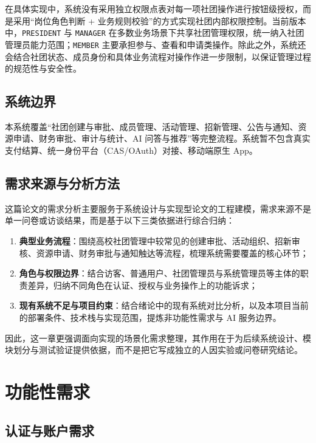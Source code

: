 在具体实现中，系统没有采用独立权限点表对每一项社团操作进行按钮级授权，而是采用“岗位角色判断 + 业务规则校验”的方式实现社团内部权限控制。当前版本中，\texttt{PRESIDENT} 与 \texttt{MANAGER} 在多数业务场景下共享社团管理权限，统一纳入社团管理员能力范围；\texttt{MEMBER} 主要承担参与、查看和申请类操作。除此之外，系统还会结合社团状态、成员身份和具体业务流程对操作作进一步限制，以保证管理过程的规范性与安全性。
\subsection{系统边界}

本系统覆盖“社团创建与审批、成员管理、活动管理、招新管理、公告与通知、资源申请、财务审批、审计与统计、AI 问答与推荐”等完整流程。系统暂不包含真实支付结算、统一身份平台（CAS/OAuth）对接、移动端原生 App。

\subsection{需求来源与分析方法}

这篇论文的需求分析主要服务于系统设计与实现型论文的工程建模，需求来源不是单一问卷或访谈结果，而是基于以下三类依据进行综合归纳：

\begin{enumerate}
  \item \textbf{典型业务流程}：围绕高校社团管理中较常见的创建审批、活动组织、招新审核、资源申请、财务审批与通知触达等流程，梳理系统需要覆盖的核心环节；
  \item \textbf{角色与权限边界}：结合访客、普通用户、社团管理员与系统管理员等主体的职责差异，归纳不同角色在认证、授权与业务操作上的功能诉求；
  \item \textbf{现有系统不足与项目约束}：结合绪论中的现有系统对比分析，以及本项目当前的部署条件、技术栈与实现范围，提炼非功能性需求与 AI 服务边界。
\end{enumerate}

因此，这一章更强调面向实现的场景化需求整理，其作用在于为后续系统设计、模块划分与测试验证提供依据，而不是把它写成独立的人因实验或问卷研究结论。

\section{功能性需求}

\subsection{认证与账户需求}

